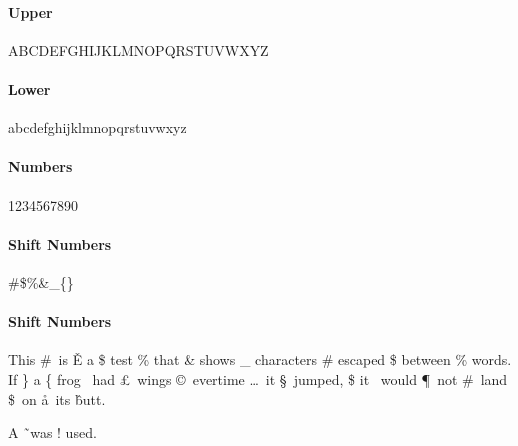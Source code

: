 \documentclass[12pt]{article}%
\begin{document}
%

\paragraph{Upper}
ABCDEFGHIJKLMNOPQRSTUVWXYZ

\paragraph{Lower}
abcdefghijklmnopqrstuvwxyz

\paragraph{Numbers}
1234567890

\paragraph{Shift Numbers}
\#\$\%\&\_\{\}

\paragraph{Shift Numbers}
This \#\ is \v{E} a \$ test \% that \& shows \_ characters \# escaped \$ between \%
words.  If \} a \{ frog \ddag\ had \pounds\ wings \copyright\ evertime \dots\ 
it \S\ jumped, \$ it \dag\ would \P\ not \#\ land \$\ on \aa\ its \^ butt.  

A \~\ was ! used.
\end{document}
